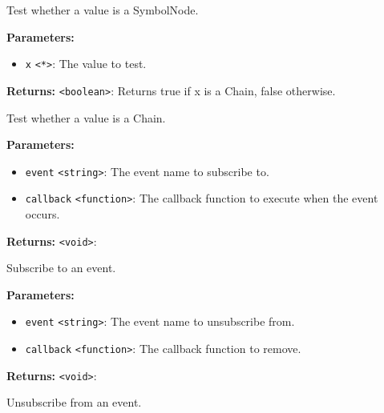\documentclass[12pt,a4paper]{article}
\begin{document}
\noindent Test whether a value is a SymbolNode.

\vspace{5mm}
\noindent {}


\noindent \textbf{Parameters:}
\begin{itemize}
  \item \texttt{x} \texttt{<*>}: The value to test.
\end{itemize}

\noindent \textbf{Returns:} \texttt{<boolean>}: Returns true if \textasciigrave{}x\textasciigrave{} is a Chain, false otherwise.

\noindent Test whether a value is a Chain.

\vspace{5mm}
\noindent {}


\noindent \textbf{Parameters:}
\begin{itemize}
  \item \texttt{event} \texttt{<string>}: The event name to subscribe to.
  \item \texttt{callback} \texttt{<function>}: The callback function to execute when the event occurs.
\end{itemize}

\noindent \textbf{Returns:} \texttt{<void>}: 

\noindent Subscribe to an event.

\vspace{5mm}
\noindent {}


\noindent \textbf{Parameters:}
\begin{itemize}
  \item \texttt{event} \texttt{<string>}: The event name to unsubscribe from.
  \item \texttt{callback} \texttt{<function>}: The callback function to remove.
\end{itemize}

\noindent \textbf{Returns:} \texttt{<void>}: 

\noindent Unsubscribe from an event.
\end{document}
